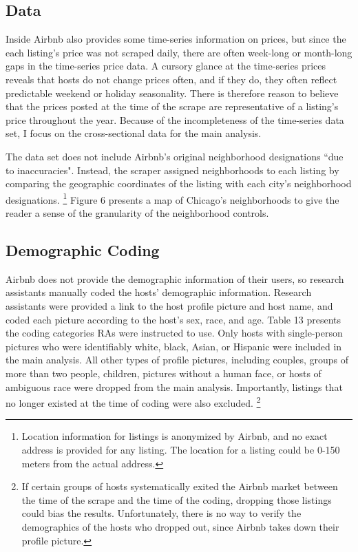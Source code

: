 \subsection*{Data}

Inside Airbnb also provides some time-series information on prices, but since the each listing's price was not scraped daily, there are often week-long or month-long gaps in the time-series price data. A cursory glance at the time-series prices reveals that hosts do not change prices often, and if they do, they often reflect predictable weekend or holiday seasonality. There is therefore reason to believe that the prices posted at the time of the scrape are representative of a listing's price throughout the year. Because of the incompleteness of the time-series data set, I focus on the cross-sectional data for the main analysis.  

The data set does not include Airbnb's original neighborhood designations ``due to inaccuracies". Instead, the scraper assigned neighborhoods to each listing by comparing the geographic coordinates of the listing with each city's neighborhood designations.%
	\footnote{Location information for listings is anonymized by Airbnb, and no exact address is provided for any listing. The location for a listing could be 0-150 meters from the actual address.} 
Figure 6 presents a map of Chicago's neighborhoods to give the reader a sense of the granularity of the neighborhood controls. 

\subsection*{Demographic Coding}

Airbnb does not provide the demographic information of their users, so research assistants manually coded the hosts' demographic information. Research assistants were provided a link to the host profile picture and host name, and coded each picture according to the host's sex, race, and age. Table 13 presents the coding categories RAs were instructed to use. Only hosts with single-person pictures who were identifiably white, black, Asian, or Hispanic were included in the main analysis. All other types of profile pictures, including couples, groups of more than two people, children, pictures without a human face, or hosts of ambiguous race were dropped from the main analysis. Importantly, listings that no longer existed at the time of coding were also excluded.%
	\footnote{If certain groups of hosts systematically exited the Airbnb market between the time of the scrape and the time of the coding, dropping those listings could bias the results. Unfortunately, there is no way to verify the demographics of the hosts who dropped out, since Airbnb takes down their profile picture.}

